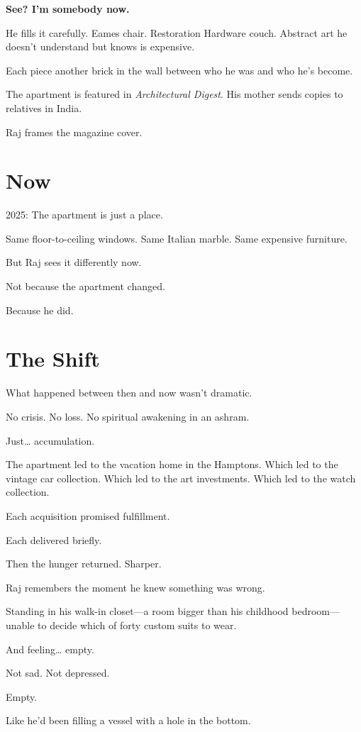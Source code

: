 \documentclass[11pt,twoside]{book}
\begin{document}
\textbf{See? I'm somebody now.}

He fills it carefully. Eames chair. Restoration Hardware couch. Abstract art he doesn't understand but knows is expensive.

Each piece another brick in the wall between who he was and who he's become.

The apartment is featured in \emph{Architectural Digest}. His mother sends copies to relatives in India.

Raj frames the magazine cover.

\section*{Now}

2025: The apartment is just a place.

Same floor-to-ceiling windows. Same Italian marble. Same expensive furniture.

But Raj sees it differently now.

Not because the apartment changed.

Because he did.

\section*{The Shift}

What happened between then and now wasn't dramatic.

No crisis. No loss. No spiritual awakening in an ashram.

Just\ldots{} accumulation.

The apartment led to the vacation home in the Hamptons. Which led to the vintage car collection. Which led to the art investments. Which led to the watch collection.

Each acquisition promised fulfillment.

Each delivered briefly.

Then the hunger returned. Sharper.

Raj remembers the moment he knew something was wrong.

Standing in his walk-in closet—a room bigger than his childhood bedroom—unable to decide which of forty custom suits to wear.

And feeling\ldots{} empty.

Not sad. Not depressed.

Empty.

Like he'd been filling a vessel with a hole in the bottom.
\end{document}
